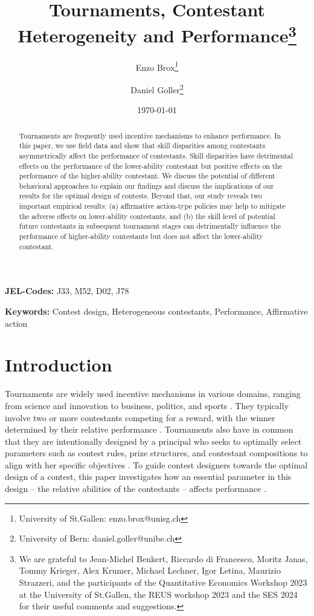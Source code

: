 \documentclass[11pt,a4paper]{article}
\title{Tournaments, Contestant Heterogeneity and Performance\footnote{We are grateful to Jean-Michel Benkert, Riccardo di Francesco, Moritz Janas, Tommy Krieger, Alex Krumer, Michael Lechner, Igor Letina, Maurizio Strazzeri, and the participants of the Quantitative Economics Workshop 2023 at the University of St.Gallen, the REUS workshop 2023 and the SES 2024 for their useful comments and suggestions.}}
\author{Enzo Brox\footnote{University of St.Gallen: enzo.brox@unisg.ch} \and Daniel Goller\footnote{University of Bern: daniel.goller@unibe.ch}}
\date{\today}
\let\Oldsection\section
\renewcommand{\section}{\FloatBarrier\Oldsection}
\newcommand{\begintext}{%
        \setcounter{page}{1}
     }
\begin{document}
\maketitle
\thispagestyle{empty}

\begin{abstract}
 Tournaments are frequently used incentive mechanisms to enhance performance. In this paper, we use field data and show that skill disparities among contestants asymmetrically affect the performance of contestants. Skill disparities have detrimental effects on the performance of the lower-ability contestant but positive effects on the performance of the higher-ability contestant. We discuss the potential of different behavioral approaches to explain our findings and discuss the implications of our results for the optimal design of contests. Beyond that, our study reveals two important empirical results: (a) affirmative action-type policies may help to mitigate the adverse effects on lower-ability contestants, and (b) the skill level of potential future contestants in subsequent tournament stages can detrimentally influence the performance of higher-ability contestants but does not affect the lower-ability contestant.
 
\end{abstract}

\textbf{JEL-Codes:} J33, M52, D02, J78\par
\textbf{Keywords:} Contest design, Heterogeneous contestants, Performance, Affirmative action\par
\newpage

\section{Introduction}
\begintext

Tournaments are widely used incentive mechanisms in various domains, ranging from science and innovation to business, politics, and sports \cite{Baye.1993, Terwiesch.2008, Gurtler.2015}. They typically involve two or more contestants competing for a reward, with the winner determined by their relative performance \cite{Corchon.2018, Lazear.2018}. Tournaments also have in common that they are intentionally designed by a principal who seeks to optimally select parameters such as contest rules, prize structures, and contestant compositions to align with her specific objectives \cite{Che.2003, Letina.2023}.
To guide contest designers towards the optimal design of a contest, this paper investigates how an essential parameter in this design -- the relative abilities of the contestants -- affects performance \cite{Lazear.1981}.\par
\end{document}
